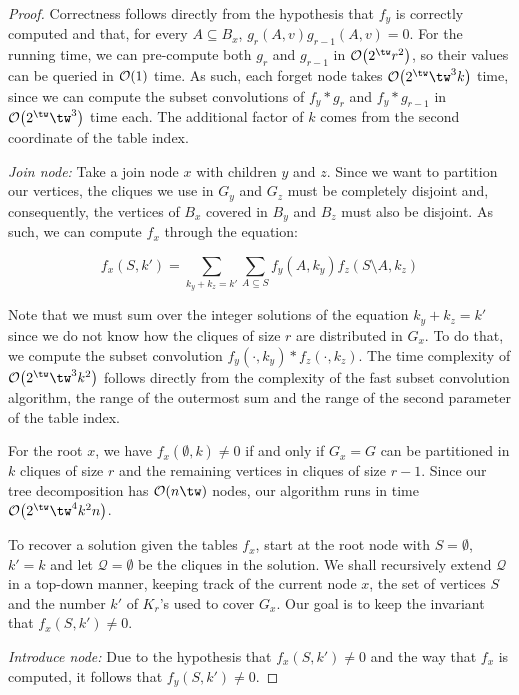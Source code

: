 \begin{proof}
    Correctness follows directly from the hypothesis that $f_y$ is correctly computed and that,  for every $A \subseteq B_x$, $g_r(A, v)g_{r-1}(A, v) = 0$.
    For the running time, we can pre-compute both $g_r$ and $g_{r-1}$ in $\bigO{2^\tw r^2}$, so their values can be queried in $\mathcal{O}\!\left(1\right)$ time.
    As such, each forget node takes $\bigO{2^\tw\tw^3k}$ time, since we can compute the subset convolutions of $f_y * g_r$ and $f_y * g_{r-1}$ in $\bigO{2^\tw\tw^3}$ time each.
    The additional factor of $k$ comes from the second coordinate of the table index.
    
    \emph{Join node:} Take a join node $x$ with children $y$ and $z$.
    Since we want to partition our vertices, the cliques we use in $G_y$ and $G_z$ must be completely disjoint and, consequently, the vertices of $B_x$ covered in $B_y$ and $B_z$ must also be disjoint.
    As such, we can compute $f_x$ through the equation:
    
    \begin{equation*}
        f_x(S, k') = \sum_{k_y + k_z = k'} \sum_{A \subseteq S} f_y(A, k_y)f_z(S \setminus A, k_z)
    \end{equation*}
    
    Note that we must sum over the integer solutions of the equation $k_y + k_z = k'$ since we do not know how the cliques of size $r$ are distributed in $G_x$.
    To do that, we compute the subset convolution $f_y(\cdot, k_y) * f_z(\cdot, k_z)$.
    The time complexity of $\bigO{2^\tw\tw^3k^2}$ follows directly from the complexity of the fast subset convolution algorithm, the range of the outermost sum and the range of the second parameter of the table index.
    
    For the root $x$, we have $f_x(\emptyset, k) \neq 0$ if and only if $G_x = G$ can be partitioned in $k$ cliques of size $r$ and the remaining vertices in cliques of size $r-1$.
    Since our tree decomposition has $\bigO{n\tw}$ nodes, our algorithm runs in time $\bigO{2^\tw\tw^4k^2n}$.
    
    To recover a solution given the tables $f_x$, start at the root node with $S = \emptyset$, $k' = k$ and let $\mathcal{Q} = \emptyset$ be the cliques in the solution.
    We shall recursively extend $\mathcal{Q}$ in a top-down manner, keeping track of the current node $x$, the set of vertices $S$ and the number $k'$ of $K_r$'s used to cover $G_x$.
    Our goal is to keep the invariant that $f_x(S, k') \neq 0$.
    
    \emph{Introduce node:} Due to the hypothesis that $f_x(S, k') \neq 0$ and the way that $f_x$ is computed, it follows that $f_y(S, k') \neq 0$.
        

\end{proof}
